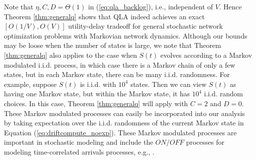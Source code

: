 \documentclass[journal]{IEEEtran}
\begin{document}
Note that $\eta, C, D=\Theta(1)$ in (\ref{eq:qla_backlog}), i.e., independent of $V$. Hence Theorem \ref{thm:generalq} shows that QLA indeed achieves an exact $[O(1/V), O(V)]$ utility-delay tradeoff for general stochastic network optimization problems with  Markovian network dynamics. Although our bounds  may be loose when the number of states is large, we note that Theorem \ref{thm:generalq} also applies to the case when $S(t)$ evolves according to a Markov modulated i.i.d. process, in which case there is a Markov chain of only a few states, but in each Markov state, there can be many i.i.d. randomness. For example, suppose $S(t)$ is i.i.d. with $10^4$ states. Then we can view $S(t)$ as having one Markov state, but within the Markov state, it has $10^4$ i.i.d. random choices. In this case, Theorem \ref{thm:generalq} will apply with $C=2$ and $D=0$. 
These Markov modulated processes can easily be incorporated into our analysis by taking expectation over the i.i.d. randomness of the current Markov state in Equation (\ref{eq:driftcompute_noexp}). 
These Markov modulated processes are important in stochastic modeling and include the $ON/OFF$ processes for modeling time-correlated arrivals processes, e.g., \cite{neely_maximaldelay_ton}. 
\end{document}
